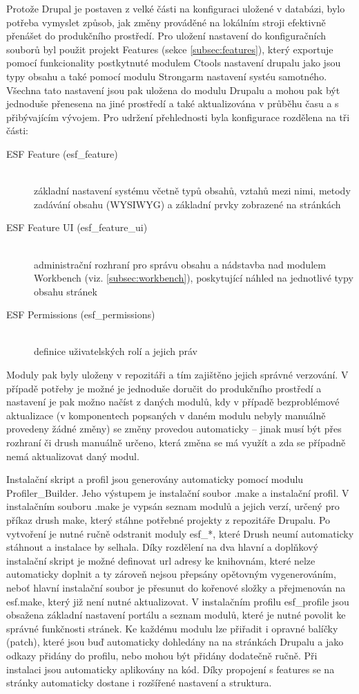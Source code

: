 Protože Drupal je postaven z velké části na konfiguraci uložené v databázi, bylo potřeba vymyslet způsob, jak změny prováděné na lokálním stroji efektivně přenášet do produkčního prostředí. Pro uložení nastavení do konfiguračních souborů byl použit projekt Features (sekce \ref{subsec:features}), který exportuje pomocí funkcionality postkytnuté modulem Ctools nastavení drupalu jako jsou typy obsahu a také pomocí modulu Strongarm nastavení systéu samotného. Všechna tato nastavení jsou pak uložena do modulu Drupalu a mohou pak být jednoduše přenesena na jiné prostředí a také aktualizována v průběhu času a s přibývajícím vývojem. Pro udržení přehlednosti byla konfigurace rozdělena na tři části:
\begin{description}
  \item[ESF Feature (esf\_feature)] \hfill \\ 
  základní nastavení systému včetně typů obsahů, vztahů mezi nimi, metody zadávání obsahu (WYSIWYG) a základní prvky zobrazené na stránkách

  \item[ESF Feature UI (esf\_feature\_ui)] \hfill \\ 
  administrační rozhraní pro správu obsahu a nádstavba nad modulem Workbench (viz. \ref{subsec:workbench}), poskytující náhled na jednotlivé typy obsahu stránek
  \item[ESF Permissions (esf\_permissions)] \hfill \\ 
  definice uživatelských rolí a jejich práv
\end{description}
Moduly pak byly uloženy v repozitáři a tím zajištěno jejich správné verzování. V případě potřeby je možné je jednoduše doručit do produkčního prostředí a nastavení je pak možno načíst z daných modulů, kdy v případě bezproblémové aktualizace (v komponentech popsaných v daném modulu nebyly manuálně provedeny žádné změny) se změny provedou automaticky – jinak musí být přes rozhraní či drush manuálně určeno, která změna se má využít a zda se případně nemá aktualizovat daný modul.

Instalační skript a profil jsou generovány automaticky pomocí modulu Profiler\_Builder. Jeho výstupem je instalační soubor .make a instalační profil. V instalačním souboru .make je vypsán seznam modulů a jejich verzí, určený pro příkaz drush make, který stáhne potřebné projekty z repozitáře Drupalu. Po vytvoření je nutné ručně odstranit moduly esf\_*, které Drush neumí automaticky stáhnout a instalace by selhala. Díky rozdělení na dva hlavní a doplňkový instalační skript je možné definovat url adresy ke knihovnám, které nelze automaticky doplnit a ty zároveň nejsou přepsány opětovným vygenerováním, neboť hlavní instalační soubor je přesunut do kořenové složky a přejmenován na esf.make, který již není nutné aktualizovat. V instalačním profilu esf\_profile jsou obsažena základní nastavení portálu a seznam modulů, které je nutné povolit ke správné funkčnosti stránek. Ke každému modulu lze přiřadit i opravné balíčky (patch), které jsou buď automaticky dohledány na na stránkách Drupalu a jako odkazy přidány do profilu, nebo mohou být přidány dodatečně ručně. Při instalaci jsou automaticky aplikovány na kód. Díky propojení s features se na stránky automaticky dostane i rozšířené nastavení a struktura.

